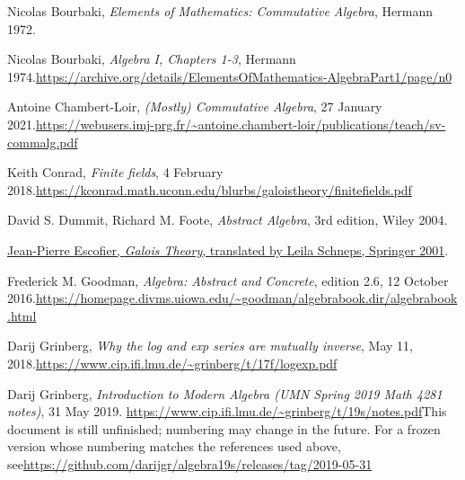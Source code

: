 \documentclass[numbers=enddot,12pt,final,onecolumn,notitlepage]{scrartcl}%
\theoremstyle{definition}
\begin{document}
\begin{thebibliography}{999999999}                                                                                        %


Nicolas Bourbaki, \textit{Elements of Mathematics:
Commutative Algebra}, Hermann 1972.

Nicolas Bourbaki, \textit{Algebra I, Chapters
1-3}, Hermann 1974.\newline\url{https://archive.org/details/ElementsOfMathematics-AlgebraPart1/page/n0}

Antoine Chambert-Loir, \textit{(Mostly)
Commutative Algebra}, 27 January 2021.\newline\url{https://webusers.imj-prg.fr/~antoine.chambert-loir/publications/teach/sv-commalg.pdf}

Keith Conrad, \textit{Finite fields}, 4 February
2018.\newline\url{https://kconrad.math.uconn.edu/blurbs/galoistheory/finitefields.pdf}

David S. Dummit, Richard M. Foote,
\textit{Abstract Algebra}, 3rd edition, Wiley 2004.

%
\href{https://dx.doi.org/10.1007/978-1-4613-0191-2}{Jean-Pierre Escofier,
\textit{Galois Theory}, translated by Leila Schneps, Springer 2001}.

Frederick M. Goodman, \textit{Algebra: Abstract and
Concrete}, edition 2.6, 12 October 2016.\newline\url{https://homepage.divms.uiowa.edu/~goodman/algebrabook.dir/algebrabook.html}

Darij Grinberg, \textit{Why the log and exp series
are mutually inverse}, May 11, 2018.\newline\url{https://www.cip.ifi.lmu.de/~grinberg/t/17f/logexp.pdf}

Darij Grinberg, \textit{Introduction to Modern Algebra
(UMN Spring 2019 Math 4281 notes)}, 31 May 2019.\newline%
\url{https://www.cip.ifi.lmu.de/~grinberg/t/19s/notes.pdf}\newline This
document is still unfinished; numbering may change in the future. For a frozen
version whose numbering matches the references used above, see\newline\url{https://github.com/darijgr/algebra19s/releases/tag/2019-05-31}


\end{thebibliography}
\end{document}
